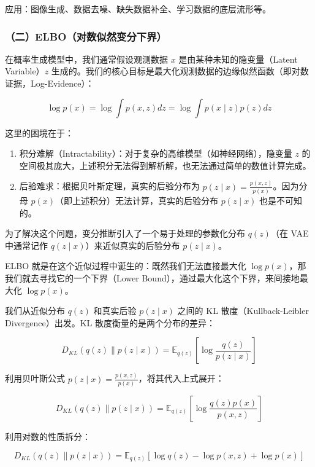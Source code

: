 应用：图像生成、数据去噪、缺失数据补全、学习数据的底层流形等。

\hypertarget{ux4e8celboux5bf9ux6570ux4f3cux7136ux53d8ux5206ux4e0bux754c}{%
\subsubsection{（二）ELBO（对数似然变分下界）}\label{ux4e8celboux5bf9ux6570ux4f3cux7136ux53d8ux5206ux4e0bux754c}}

在概率生成模型中，我们通常假设观测数据 \(x\) 是由某种未知的隐变量（Latent Variable）\(z\) 生成的。我们的核心目标是最大化观测数据的边缘似然函数（即对数证据，Log-Evidence）：

\[
\log p(x)=\log\int p(x,z)dz=\log\int p(x\mid z)p(z)dz
\]

这里的困境在于：

\begin{enumerate}
\def\labelenumi{\arabic{enumi}.}
\tightlist
\item
  积分难解（Intractability）：对于复杂的高维模型（如神经网络），隐变量 \(z\) 的空间极其庞大，上述积分无法得到解析解，也无法通过简单的数值计算完成。
\item
  后验难求：根据贝叶斯定理，真实的后验分布为 \(p(z\mid x)=\frac{p(x,z)}{p(x)}\)。因为分母 \(p(x)\)（即上述积分）无法计算，真实的后验分布 \(p(z\mid x)\) 也是不可知的。
\end{enumerate}

为了解决这个问题，变分推断引入了一个易于处理的参数化分布 \(q(z)\)（在 VAE 中通常记作 \(q(z\mid x)\)）来近似真实的后验分布 \(p(z\mid x)\)。

ELBO 就是在这个近似过程中诞生的：既然我们无法直接最大化 \(\log p(x)\)，那我们就去寻找它的一个下界（Lower Bound），通过最大化这个下界，来间接地最大化 \(\log p(x)\)。

我们从近似分布 \(q(z)\) 和真实后验 \(p(z\mid x)\) 之间的 KL 散度（Kullback-Leibler Divergence）出发。KL 散度衡量的是两个分布的差异：

\[
D_{KL}(q(z)\parallel p(z\mid x))=\mathbb{E}_{q(z)}\left[\log\frac{q(z)}{p(z\mid x)}\right]
\]

利用贝叶斯公式 \(p(z\mid x)=\frac{p(x,z)}{p(x)}\)，将其代入上式展开：

\[
D_{KL}(q(z)\parallel p(z\mid x))=\mathbb{E}_{q(z)}\left[\log\frac{q(z)p(x)}{p(x,z)}\right]
\]

利用对数的性质拆分：

\[
D_{KL}(q(z)\parallel p(z\mid x))=\mathbb{E}_{q(z)}[\log q(z)-\log p(x,z)+\log p(x)]
\]

